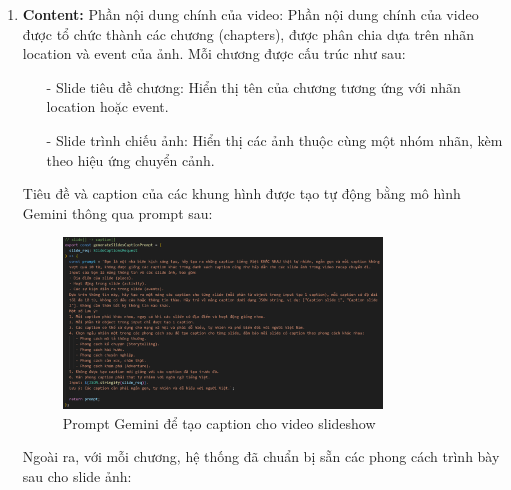 \begin{enumerate}
    \item \textbf{Content:} Phần nội dung chính của video:
    Phần nội dung chính của video được tổ chức thành các chương (chapters), được phân chia dựa trên nhãn location và event của ảnh. Mỗi chương được cấu trúc như sau:
    \begin{itemize}
        \item[-] Slide tiêu đề chương: Hiển thị tên của chương tương ứng với nhãn location hoặc event. 
        \item[-] Slide trình chiếu ảnh: Hiển thị các ảnh thuộc cùng một nhóm nhãn, kèm theo hiệu ứng chuyển cảnh.
    \end{itemize}
    
    Tiêu đề và caption của các khung hình được tạo tự động bằng mô hình Gemini thông qua prompt sau:
    
    \begin{figure}[H]
        \centering  
        \includegraphics[width=0.8\textwidth]{figures/c4/4_1/prompt.png}
        \caption{Prompt Gemini để tạo caption cho video slideshow}
        \label{fig:gemini-prompt}
    \end{figure}
    
    Ngoài ra, với mỗi chương, hệ thống đã chuẩn bị sẵn các phong cách trình bày sau cho slide ảnh:
    

\end{enumerate}
